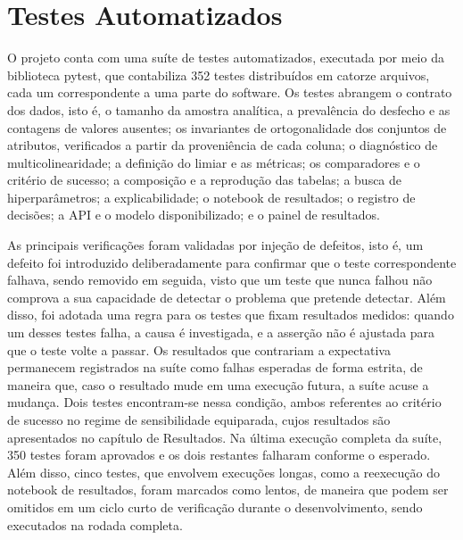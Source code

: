 \section{Testes Automatizados}\label{sec:testes}
O projeto conta com uma suíte de testes automatizados, executada por meio da biblioteca pytest, que contabiliza 352 testes distribuídos em catorze arquivos, cada um correspondente a uma parte do software. Os testes abrangem o contrato dos dados, isto é, o tamanho da amostra analítica, a prevalência do desfecho e as contagens de valores ausentes; os invariantes de ortogonalidade dos conjuntos de atributos, verificados a partir da proveniência de cada coluna; o diagnóstico de multicolinearidade; a definição do limiar e as métricas; os comparadores e o critério de sucesso; a composição e a reprodução das tabelas; a busca de hiperparâmetros; a explicabilidade; o notebook de resultados; o registro de decisões; a API e o modelo disponibilizado; e o painel de resultados.

As principais verificações foram validadas por injeção de defeitos, isto é, um defeito foi introduzido deliberadamente para confirmar que o teste correspondente falhava, sendo removido em seguida, visto que um teste que nunca falhou não comprova a sua capacidade de detectar o problema que pretende detectar. Além disso, foi adotada uma regra para os testes que fixam resultados medidos: quando um desses testes falha, a causa é investigada, e a asserção não é ajustada para que o teste volte a passar. Os resultados que contrariam a expectativa permanecem registrados na suíte como falhas esperadas de forma estrita, de maneira que, caso o resultado mude em uma execução futura, a suíte acuse a mudança. Dois testes encontram-se nessa condição, ambos referentes ao critério de sucesso no regime de sensibilidade equiparada, cujos resultados são apresentados no capítulo de Resultados. Na última execução completa da suíte, 350 testes foram aprovados e os dois restantes falharam conforme o esperado. Além disso, cinco testes, que envolvem execuções longas, como a reexecução do notebook de resultados, foram marcados como lentos, de maneira que podem ser omitidos em um ciclo curto de verificação durante o desenvolvimento, sendo executados na rodada completa.

